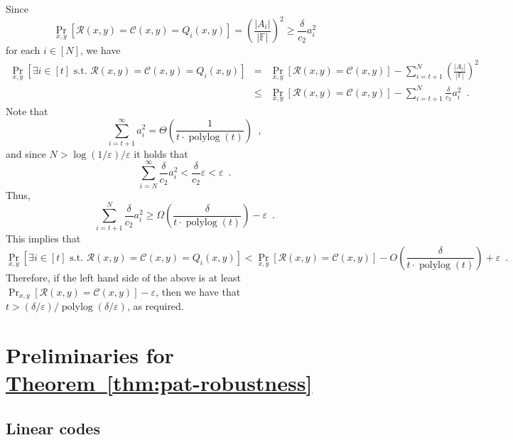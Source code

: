 \documentclass[11pt]{article}
\numberwithin{equation}{section}
\theoremstyle{definition}
\theoremstyle{plain}
\newcommand{\expref}[2]{\hyperref[#2]{#1~\ref{#2}}}
\theoremstyle{plain}
\newcommand{\colored}{}
\newcommand{\Field}{\colored{\mathbb F}}
\newcommand{\st}{\colored{\text{ s.t. }}}
\newcommand{\rowpoly}{\colored{\mathcal R}}
\newcommand{\colpoly}{\colored{\mathcal C}}
\newcommand{\prox}{\colored{\delta}}
\newcommand{\polylog}{\operatorname{polylog}}
\newcommand{\eps}{\varepsilon}
\newcommand\abs[1]{\colored{\left|#1\right|}}
\begin{document}
   Since
   \[
     \Pr_{x,y}[\rowpoly(x,y) = \colpoly(x,y) = Q_i(x,y)] = \left(\frac{\abs{A_i}}{\abs{\Field}}\right)^2 \geq \frac{\prox}{c_2} a_i^2
     \]
    for each $i \in [N]$, we have
    \begin{eqnarray*}
        \Pr_{x,y}[\exists i \in [t] \st \rowpoly(x,y) = \colpoly(x,y) = Q_i(x,y)]
        &=& \Pr_{x,y}[\rowpoly(x,y) = \colpoly(x,y)] - \sum_{i=t+1}^N \left(\frac{\abs{A_i}}{\abs{\Field}}\right)^2 \\
        &\leq& \Pr_{x,y}[\rowpoly(x,y) = \colpoly(x,y)] - \sum_{i=t+1}^N \frac{\prox}{c_2} a_i^2
        \enspace.
    \end{eqnarray*}
    Note that
    \[
      \sum_{i=t+1}^\infty a_i^2 = \Theta \left( \frac{1}{t \cdot \polylog(t)} \right)\enspace,
    \]
    and since $N > {\log(1/\eps)}/{\eps}$
    it holds that
    \[
      \sum_{i=N}^{\infty} \frac{\prox}{c_2} a_i^2 < \frac{\prox}{c_2}\eps < \eps\enspace.
    \]
    Thus,
    \[
      \sum_{i=t+1}^N \frac{\prox}{c_2} a_i^2 \geq \Omega \left( \frac{\prox}{t \cdot \polylog(t)} \right) - \eps\enspace.
    \]
    This implies that
    \begin{equation*}
        \Pr_{x,y}[\exists i \in [t] \st \rowpoly(x,y) = \colpoly(x,y) = Q_i(x,y)] < \Pr_{x,y}[\rowpoly(x,y) = \colpoly(x,y)] - O\left(\frac{\prox}{t \cdot \polylog(t)}\right)+ \eps
        \enspace.
    \end{equation*}
    Therefore, if the left hand side of the above is at least $\Pr_{x,y}[\rowpoly(x,y) = \colpoly(x,y)] - \eps $, then we have that $t  > {(\prox/\eps)}/{\polylog(\prox/\eps)}$,
    as required.

%
%
%

\section{Preliminaries for \expref{Theorem}{thm:pat-robustness}}
\label{sec:prelim-pat}

%
%
\subsection{Linear codes}
\label{sec:linear-codes}
\end{document}
